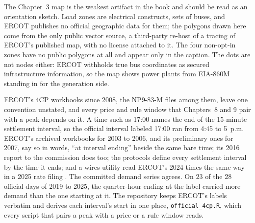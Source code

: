 The Chapter~3 map is the weakest artifact in the book and should be read as an
orientation sketch. Load zones are electrical constructs, sets of buses, and
ERCOT publishes no official geographic data for them; the polygons drawn here
come from the only public vector source, a third-party re-host of a tracing of
ERCOT's published map, with no license attached to it. The four
non-opt-in zones have no public polygons at all and appear only in the caption.
The dots are not nodes either: ERCOT withholds true bus coordinates as secured
infrastructure information, so the map shows power plants from EIA-860M
standing in for the generation side. %

ERCOT's 4CP workbooks since 2008, the NP9-83-M files among them, leave one
convention unstated, and every price and rule window that Chapters~8 and 9
pair with a peak depends on it. A time such as 17:00 names the end of the
15-minute settlement interval, so the official interval labeled 17:00 ran
from 4:45 to 5~p.m. ERCOT's archived workbooks for 2003 to 2006, and its
preliminary ones for 2007, say so in words, ``at interval ending'' beside the
same bare time; its 2016 report to the commission does too; the protocols define
every settlement interval by the time it ends; and a wires utility read
ERCOT's 2024 times the same way in a 2025 rate filing
\autocite{ercot4cphistzip,ercot4cp2016puct,ercot2026protocols,aeptexas58315}.
The committed demand series agrees. On 23 of the 28 official days of 2019 to
2025, the quarter-hour ending at the label carried more demand than the one
starting at it. The repository keeps ERCOT's labels verbatim and derives each
interval's start in one place, \texttt{official\_4cp.R}, which every script
that pairs a peak with a price or a rule window reads. %

